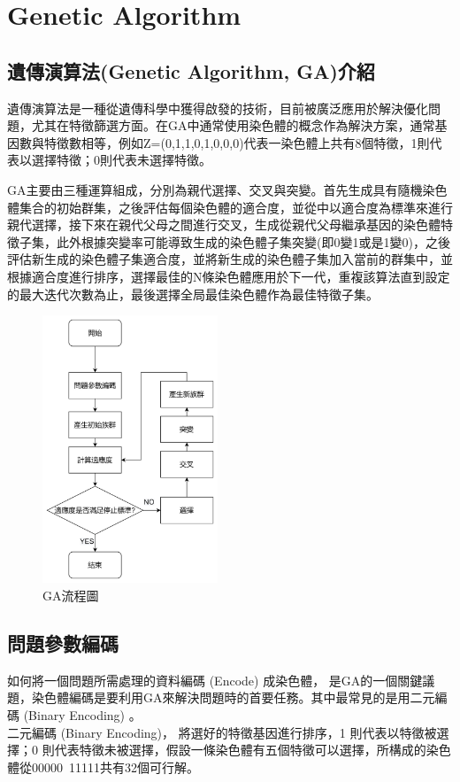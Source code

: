 \chapter{Genetic Algorithm}
\label{chapter:intro}
\section{遺傳演算法(Genetic Algorithm, GA)介紹}
遺傳演算法是一種從遺傳科學中獲得啟發的技術，目前被廣泛應用於解決優化問題，尤其在特徵篩選方面。在GA中通常使用染色體的概念作為解決方案，通常基因數與特徵數相等，例如Z=(0,1,1,0,1,0,0,0)代表一染色體上共有8個特徵，1則代表以選擇特徵；0則代表未選擇特徵。

GA主要由三種運算組成，分別為親代選擇、交叉與突變。首先生成具有隨機染色體集合的初始群集，之後評估每個染色體的適合度，並從中以適合度為標準來進行親代選擇，接下來在親代父母之間進行交叉，生成從親代父母繼承基因的染色體特徵子集，此外根據突變率可能導致生成的染色體子集突變(即0變1或是1變0)，之後評估新生成的染色體子集適合度，並將新生成的染色體子集加入當前的群集中，並根據適合度進行排序，選擇最佳的N條染色體應用於下一代，重複該算法直到設定的最大迭代次數為止，最後選擇全局最佳染色體作為最佳特徵子集。
\begin{figure}[H]
	\centerline{\includegraphics[height=8cm]{pic/GAFlowChart.PNG}}
	\caption{GA流程圖}
	\label{fig:GAFlowChart}
\end{figure}

\label{sec:background}
\section{問題參數編碼}
如何將一個問題所需處理的資料編碼 (Encode) 成染色體，
是GA的一個關鍵議題，染色體編碼是要利用GA來解決問題時的首要任務。其中最常見的是用二元編碼 (Binary Encoding) 。\\
二元編碼 (Binary Encoding)，
將選好的特徵基因進行排序，1 則代表以特徵被選擇；0 則代表特徵未被選擇，假設一條染色體有五個特徵可以選擇，所構成的染色體從00000~11111共有32個可行解。



